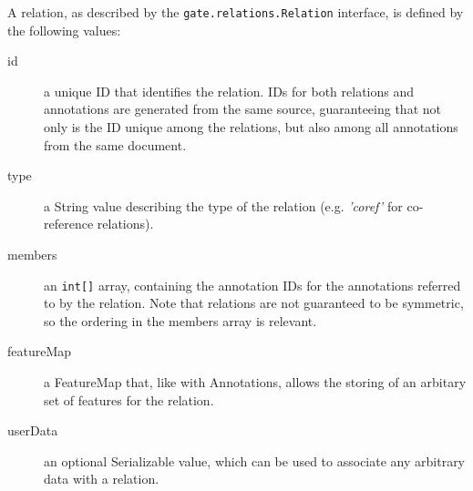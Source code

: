 A relation, as described by the \lstinline!gate.relations.Relation! interface,
is defined by the following values:
\begin{description}
\item[id] a unique ID that identifies the relation. IDs for both relations and
  annotations are generated from the same source, guaranteeing that not only is
  the ID unique among the relations, but also among all annotations from the
  same document.
\item[type] a String value describing the type of the relation (e.g. {\em
 'coref'} for co-reference relations).
\item[members] an \lstinline!int[]! array, containing the annotation IDs for the
  annotations referred to by the relation. Note that relations are not
  guaranteed to be symmetric, so the ordering in the members array is
  relevant.
\item[featureMap] a FeatureMap that, like with Annotations, allows the storing
  of an arbitary set of features for the relation.
\item[userData] an optional Serializable value, which can be used to associate
  any arbitrary data with a relation.
\end{description}

